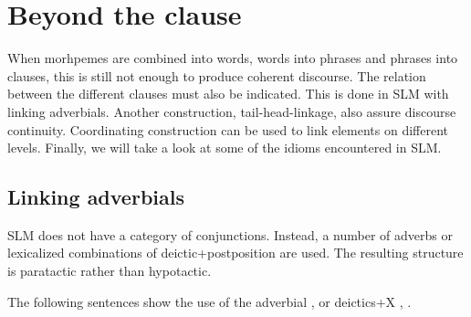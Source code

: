 \chapter{Beyond the clause}\label{sec:form:SuperclausalConstructions}
When morhpemes are combined into words, words into phrases and phrases into clauses, this is still not enough to produce coherent discourse. The relation between the different clauses must also be indicated. This is done in SLM with linking adverbials. Another construction, tail-head-linkage, also assure discourse continuity. Coordinating construction can be used to link elements on different levels. Finally, we will take a look at some of the idioms encountered in SLM.

\section{Linking adverbials}\label{sec:constr:Linkingadverbials}
SLM does not have a category of conjunctions. Instead, a number of adverbs or lexicalized combinations of deictic+postposition are used. The resulting structure is paratactic rather than hypotactic. 



The following sentences show the use of the adverbial
, or deictics+X
,
.


\\ 


\\ 



